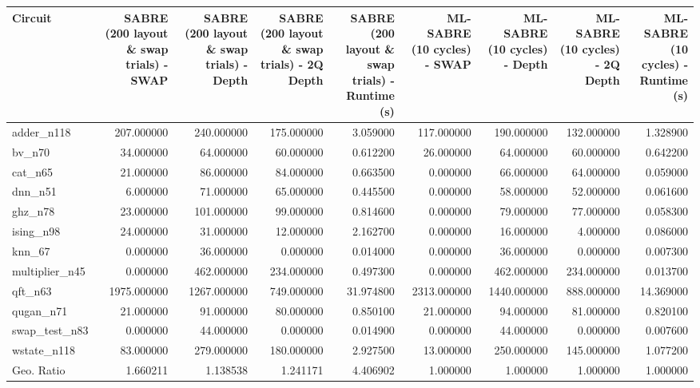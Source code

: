 \begin{tabular}{lrrrrrrrr}
\toprule
Circuit & SABRE (200 layout \& swap trials) - SWAP & SABRE (200 layout \& swap trials) - Depth & SABRE (200 layout \& swap trials) - 2Q Depth & SABRE (200 layout \& swap trials) - Runtime (s) & ML-SABRE (10 cycles) - SWAP & ML-SABRE (10 cycles) - Depth & ML-SABRE (10 cycles) - 2Q Depth & ML-SABRE (10 cycles) - Runtime (s) \\
\midrule
adder\_n118 & 207.000000 & 240.000000 & 175.000000 & 3.059000 & 117.000000 & 190.000000 & 132.000000 & 1.328900 \\
bv\_n70 & 34.000000 & 64.000000 & 60.000000 & 0.612200 & 26.000000 & 64.000000 & 60.000000 & 0.642200 \\
cat\_n65 & 21.000000 & 86.000000 & 84.000000 & 0.663500 & 0.000000 & 66.000000 & 64.000000 & 0.059000 \\
dnn\_n51 & 6.000000 & 71.000000 & 65.000000 & 0.445500 & 0.000000 & 58.000000 & 52.000000 & 0.061600 \\
ghz\_n78 & 23.000000 & 101.000000 & 99.000000 & 0.814600 & 0.000000 & 79.000000 & 77.000000 & 0.058300 \\
ising\_n98 & 24.000000 & 31.000000 & 12.000000 & 2.162700 & 0.000000 & 16.000000 & 4.000000 & 0.086000 \\
knn\_67 & 0.000000 & 36.000000 & 0.000000 & 0.014000 & 0.000000 & 36.000000 & 0.000000 & 0.007300 \\
multiplier\_n45 & 0.000000 & 462.000000 & 234.000000 & 0.497300 & 0.000000 & 462.000000 & 234.000000 & 0.013700 \\
qft\_n63 & 1975.000000 & 1267.000000 & 749.000000 & 31.974800 & 2313.000000 & 1440.000000 & 888.000000 & 14.369000 \\
qugan\_n71 & 21.000000 & 91.000000 & 80.000000 & 0.850100 & 21.000000 & 94.000000 & 81.000000 & 0.820100 \\
swap\_test\_n83 & 0.000000 & 44.000000 & 0.000000 & 0.014900 & 0.000000 & 44.000000 & 0.000000 & 0.007600 \\
wstate\_n118 & 83.000000 & 279.000000 & 180.000000 & 2.927500 & 13.000000 & 250.000000 & 145.000000 & 1.077200 \\
Geo. Ratio & 1.660211 & 1.138538 & 1.241171 & 4.406902 & 1.000000 & 1.000000 & 1.000000 & 1.000000 \\
\bottomrule
\end{tabular}
